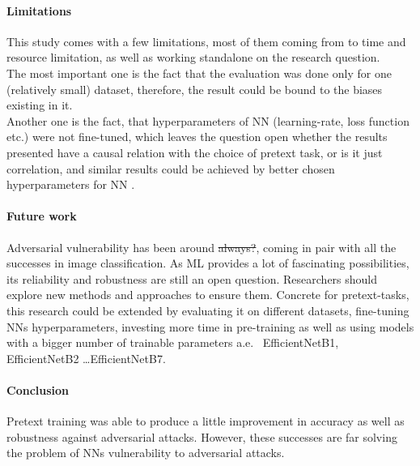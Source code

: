 \paragraph{Limitations}This study comes with a few limitations,
most of them coming from to time and resource limitation, as well as working standalone on the research question.
\\
The most important one is the fact that the evaluation was done only for one (relatively small) dataset,
therefore, the result could be bound to the biases existing in it.
\\
Another one is the fact, that hyperparameters of NN (learning-rate, loss function etc.)
were not fine-tuned, which leaves the question open whether the
results presented have a causal relation with the choice of pretext task, or is it just correlation,
and similar results could be achieved by better chosen hyperparameters for NN .

\paragraph{Future work}
Adversarial vulnerability has been around \st{always?}, coming in pair with all the successes in image classification.
As ML provides a lot of fascinating possibilities, its reliability and robustness are still an open question.
Researchers should explore new methods and approaches to ensure them.
Concrete for pretext-tasks, this research could be extended by evaluating it on different datasets, fine-tuning NNs
hyperparameters, investing more time in pre-training as well as using models with a bigger number of trainable parameters
a.e. \ EfficientNetB1, EfficientNetB2 \ldots EfficientNetB7.

\paragraph{Conclusion}
Pretext training was able to produce a little improvement in accuracy as well as robustness against adversarial attacks.
However, these successes are far solving the problem of NNs vulnerability to adversarial attacks.

